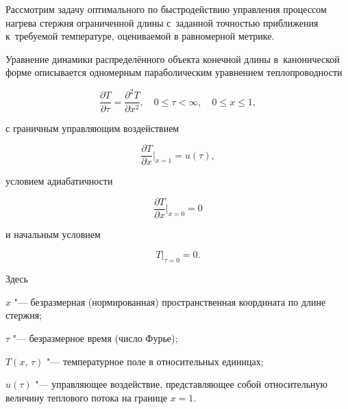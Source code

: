 Рассмотрим задачу оптимального по быстродействию управления процессом нагрева стержня ограниченной длины с~заданной точностью приближения к~требуемой температуре, оцениваемой в равномерной метрике.



Уравнение динамики распределённого объекта конечной длины в~канонической форме описывается одномерным параболическим уравнением теплопроводности

\begin{equation}

\frac{\partial T}{\partial \tau }=\frac{\partial ^2T}{\partial x^2},

\quad

0\le \tau <\infty ,\quad 0\le x \le 1, 

\label{dilig:eq1}

\end{equation}

с граничным управляющим воздействием

\begin{equation}

\frac{\partial T}{\partial x} \Bigr|_{x=1} =u(\tau ),

\label{dilig:eq2}

\end{equation}

условием адиабатичности

\begin{equation}

\label{dilig:eq3}

\frac{\partial T}{\partial x} \Bigr|_{x=0} =0

\end{equation}

и начальным условием

\begin{equation}

\label{dilig:eq4}

T \bigr|_{\tau =0} =0.

\end{equation}

Здесь 

$x$ "--- безразмерная (нормированная) пространственная координата по длине стержня; 

$\tau $ "--- безразмерное время (число Фурье); 

$T(x,\,\tau )$ "--- температурное поле в относительных единицах; 

$u(\tau )$ "--- управляющее воздействие, представляющее собой относительную величину теплового потока на границе \mbox{$x=1$}.



